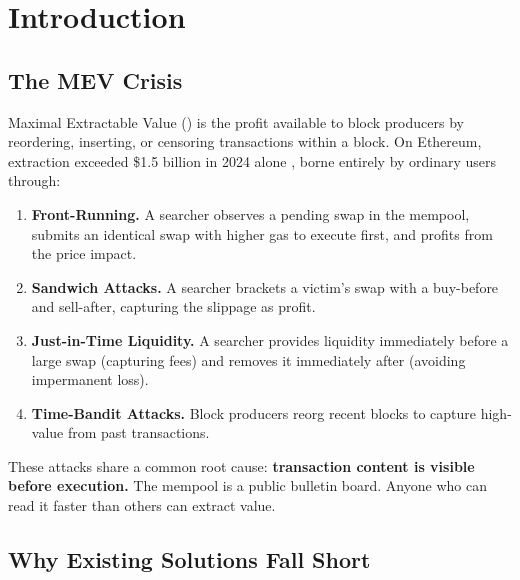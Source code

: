 \section{Introduction}

\label{sec:intro}

\subsection{The MEV Crisis}

Maximal Extractable Value (\MEV{}) is the profit available to block producers by reordering, inserting, or censoring transactions within a block. On Ethereum, \MEV{} extraction exceeded \$1.5 billion in 2024 alone \cite{flashbots2024mev}, borne entirely by ordinary users through:

\begin{enumerate}
    \item \textbf{Front-Running.} A searcher observes a pending swap in the mempool, submits an identical swap with higher gas to execute first, and profits from the price impact.
    \item \textbf{Sandwich Attacks.} A searcher brackets a victim's swap with a buy-before and sell-after, capturing the slippage as profit.
    \item \textbf{Just-in-Time Liquidity.} A searcher provides liquidity immediately before a large swap (capturing fees) and removes it immediately after (avoiding impermanent loss).
    \item \textbf{Time-Bandit Attacks.} Block producers reorg recent blocks to capture high-value \MEV{} from past transactions.
\end{enumerate}

These attacks share a common root cause: \textbf{transaction content is visible before execution.} The mempool is a public bulletin board. Anyone who can read it faster than others can extract value.

\subsection{Why Existing Solutions Fall Short}

